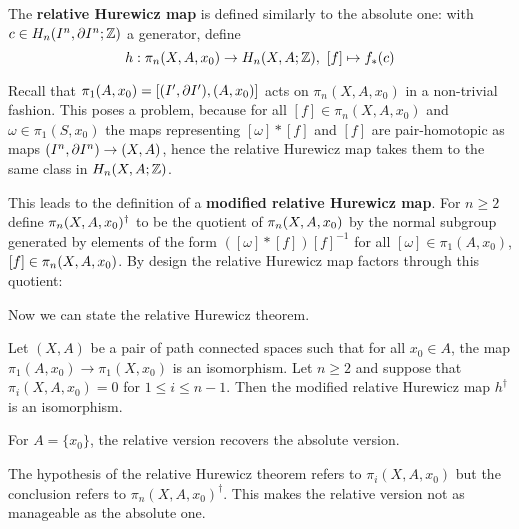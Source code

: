 The \textbf{relative Hurewicz map} is defined similarly to the absolute one: with $c\in H_n(I^n,\partial I^n;{\mathbb Z})$ a generator, define
\[h:\pi_n(X,A,x_0)\to H_n(X,A;{\mathbb Z}),\ [f]\mapsto f_*(c)\]


Recall that $\pi_1(A,x_0)=[(I',\partial I'),(A,x_0)]$ acts on $\pi_n(X,A,x_0)$ in a non-trivial fashion. This poses a problem, because for all $[f]\in\pi_n(X,A,x_0)$ and $\omega\in\pi_1(S,x_0)$ the maps representing $[\omega]*[f]$ and $[f]$ are pair-homotopic as maps $(I^n,\partial I^n)\to(X,A)$, hence the relative Hurewicz map takes them to the same class in $H_n(X,A;{\mathbb Z})$.

This leads to the definition of a \textbf{modified relative Hurewicz map}. For $n\geq2$ define $\pi_n(X,A,x_0)^\dagger$ to be the quotient of $\pi_n(X,A,x_0)$ by the normal subgroup generated by elements of the form $([\omega]*[f])[f]^{-1}$ for all $[\omega]\in\pi_1(A,x_0)$, $[f]\in\pi_n(X,A,x_0)$. By design the relative Hurewicz map factors through this quotient:
\begin{center}
\end{center}

Now we can state the relative Hurewicz theorem.

\begin{theorem}[Hurewicz]
Let $(X,A)$ be a pair of path connected spaces such that for all $x_0\in A$, the map $\pi_1(A,x_0)\to\pi_1(X,x_0)$ is an isomorphism. Let $n\geq2$ and suppose that $\pi_i(X,A,x_0)=0$ for $1\leq i\leq n-1$. Then the modified relative Hurewicz map $h^\dagger$ is an isomorphism.
\end{theorem}

\begin{remark}
For $A=\{x_0\}$, the relative version recovers the absolute version.
\end{remark}

\begin{remark}
The hypothesis of the relative Hurewicz theorem refers to $\pi_i(X,A,x_0)$ but the conclusion refers to $\pi_n(X,A,x_0)^\dagger$. This makes the relative version not as manageable as the absolute one.
\end{remark}
